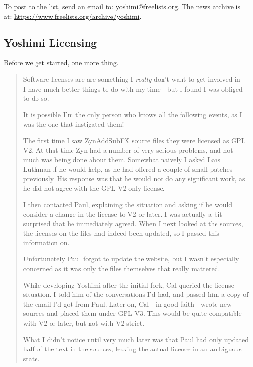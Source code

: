 \documentclass[
 11pt,
 twoside,
 a4paper,
 headinclude,
 footinclude,
 final                                 %
]{article}
\begin{document}
   To post to the list, send an email to: \url{yoshimi@freelists.org}.
   The news archive is at: \url{https://www.freelists.org/archive/yoshimi}.

\subsection{Yoshimi Licensing}
\label{subsec:introduction_yoshimi_licensing}

   Before we get started, one more thing.

   \begin{quotation}
      Software licenses are are something I \textsl{really}
      don't want to get involved in - I have much better things to do with my
      time - but I found I was obliged to do so.

      It is possible I'm the only person who knows all the following events, as
      I was the one that instigated them!

      The first time I saw ZynAddSubFX source files they were licensed as GPL
      V2. At that time Zyn had a number of very serious problems, and not much
      was being done about them. Somewhat naively I asked Lars Luthman if he
      would help, as he had offered a couple of small patches previously. His
      response was that he would not do any significant work, as he did not
      agree with the GPL V2 only license.

      I then contacted Paul, explaining the situation and asking if he would
      consider a change in the license to V2 or later. I was actually a bit
      surprised that he immediately agreed. When I next looked at the sources,
      the licenses on the files had indeed been updated, so I passed this
      information on.

      Unfortunately Paul forgot to update the website, but I wasn't especially
      concerned as it was only the files themselves that really mattered.

      While developing Yoshimi after the initial fork, Cal queried the license
      situation. I told him of the conversations I'd had, and passed him a copy
      of the email I'd got from Paul. Later on, Cal - in good faith - wrote new
      sources and placed them under GPL V3. This would be quite compatible with
      V2 or later, but not with V2 strict.

      What I didn't notice until very much later was that Paul had only updated
      half of the text in the sources, leaving the actual licence in an
      ambiguous state.


\end{quotation}
\end{document}
